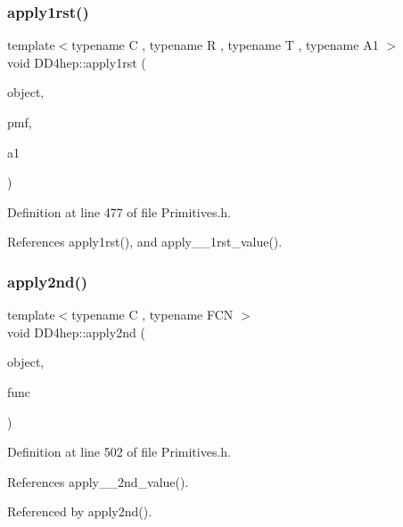 \hypertarget{namespace_d_d4hep_a05ec64b906bbf71787bb54a37443bd61}{}\label{namespace_d_d4hep_a05ec64b906bbf71787bb54a37443bd61} 
\subsubsection{\texorpdfstring{apply1rst()}{apply1rst()}\hspace{0.1cm}{\footnotesize\ttfamily [3/3]}}
{\footnotesize\ttfamily template$<$typename C , typename R , typename T , typename A1 $>$ \\
void D\+D4hep\+::apply1rst (\begin{DoxyParamCaption}\item[{C}]{object,  }\item[{R(T\+::$\ast$)(A1 a1)}]{pmf,  }\item[{A1}]{a1 }\end{DoxyParamCaption})}



Definition at line 477 of file Primitives.\+h.



References apply1rst(), and apply\+\_\+\+\_\+1rst\+\_\+value().

\hypertarget{namespace_d_d4hep_a4137ce26160b52fbd421be1f6b3fdd3a}{}\label{namespace_d_d4hep_a4137ce26160b52fbd421be1f6b3fdd3a} 
\subsubsection{\texorpdfstring{apply2nd()}{apply2nd()}\hspace{0.1cm}{\footnotesize\ttfamily [1/3]}}
{\footnotesize\ttfamily template$<$typename C , typename F\+CN $>$ \\
void D\+D4hep\+::apply2nd (\begin{DoxyParamCaption}\item[{C \&}]{object,  }\item[{const F\+CN \&}]{func }\end{DoxyParamCaption})}



Definition at line 502 of file Primitives.\+h.



References apply\+\_\+\+\_\+2nd\+\_\+value().



Referenced by apply2nd().

